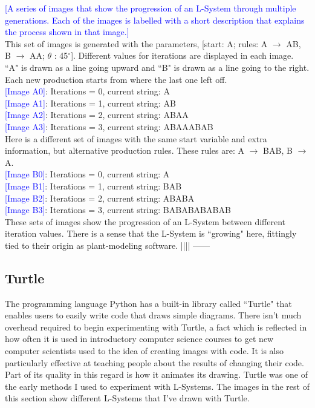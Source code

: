 \documentclass[12pt,twoside]{reedthesis}
\begin{document}
\textcolor{blue}{[A series of images that show the progression of an L-System through multiple generations. Each of the images is labelled with a short description that explains the process shown in that image.]}\\

This set of images is generated with the parameters, [start: A; rules: A $\rightarrow$ AB, B $\rightarrow$ AA; $\theta$ : 45$^{\circ}$]. Different values for iterations are displayed in each image. ``A" is drawn as a line going upward and ``B" is drawn as a line going to the right. Each new production starts from where the last one left off. 
\\\textcolor{blue}{[Image A0]}: Iterations = 0, current string: A
\\\textcolor{blue}{[Image A1]}: Iterations = 1, current string: AB
\\\textcolor{blue}{[Image A2]}: Iterations = 2, current string: ABAA
\\\textcolor{blue}{[Image A3]}: Iterations = 3, current string: ABAAABAB \\

Here is a different set of images with the same start variable and extra information, but alternative production rules. These rules are: A $\rightarrow$ BAB, B $\rightarrow$ A.
\\\textcolor{blue}{[Image B0]}: Iterations = 0, current string: A
\\\textcolor{blue}{[Image B1]}: Iterations = 1, current string: BAB
\\\textcolor{blue}{[Image B2]}: Iterations = 2, current string: ABABA
\\\textcolor{blue}{[Image B3]}: Iterations = 3, current string: BABABABABAB\\

These sets of images show the progression of an L-System between different iteration values. There is a sense that the L-System is ``growing" here, fittingly tied to their origin as plant-modeling software. |||| ——

\subsection{Turtle}

	The programming language Python has a built-in library called ``Turtle" that enables users to easily write code that draws simple diagrams. There isn't much overhead required to begin experimenting with Turtle, a fact which is reflected in how often it is used in introductory computer science courses to get new computer scientists used to the idea of creating images with code. It is also particularly effective at teaching people about the results of changing their code. Part of its quality in this regard is how it animates its drawing. Turtle was one of the early methods I used to experiment with L-Systems. The images in the rest of this section show different L-Systems that I've drawn with Turtle.\\
	
\end{document}
